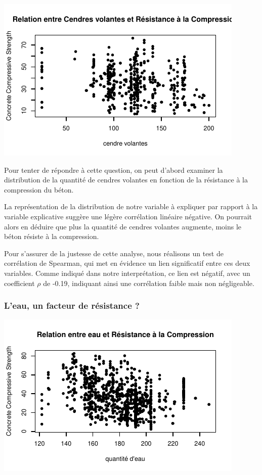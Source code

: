 \documentclass[
  12pt,
]{article}
\begin{document}
\begin{center}\includegraphics{rmd_final_files/figure-latex/unnamed-chunk-16-1} \end{center}

Pour tenter de répondre à cette question, on peut d'abord examiner la
distribution de la quantité de cendres volantes en fonction de la
résistance à la compression du béton.

La représentation de la distribution de notre variable à expliquer par
rapport à la variable explicative suggère une légère corrélation
linéaire négative. On pourrait alors en déduire que plus la quantité de
cendres volantes augmente, moins le béton résiste à la compression.

Pour s'assurer de la justesse de cette analyse, nous réalisons un test
de corrélation de Spearman, qui met en évidence un lien significatif
entre ces deux variables. Comme indiqué dans notre interprétation, ce
lien est négatif, avec un coefficient \(\rho\) de -0.19, indiquant ainsi
une corrélation faible mais non négligeable.

\subsubsection{L'eau, un facteur de résistance
?}\label{leau-un-facteur-de-ruxe9sistance}

\begin{center}\includegraphics{rmd_final_files/figure-latex/unnamed-chunk-18-1} \end{center}
\end{document}
